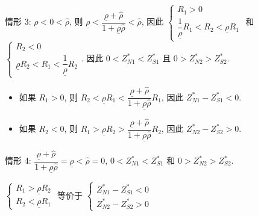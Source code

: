 \documentclass[10.0pt]{article}
\begin{document}
情形 3: $ \underline{\rho} < 0 < {\hat \rho} $, 则 $ \underline{\rho} < \dfrac{\underline{\rho} + {\hat \rho}}{1 + \underline{\rho} {\hat \rho}} < {\hat \rho} $, 因此 $ \left\{ \begin{matrix} R_1 > 0 \\ \dfrac{1}{\underline{\rho}} R_1 < R_2 < \underline{\rho} R_1 \end{matrix} \right. $ 和 $ \left\{ \begin{matrix} R_2 < 0 \\ \underline{\rho} R_2 < R_1 < \dfrac{1}{\underline{\rho}} R_2 \end{matrix} \right. $.
因此 $ 0 < Z_{N 1}^* < Z_{S 1}^* $ 且 $ 0 > Z_{N 2}^* > Z_{S 2}^* $.
\begin{itemize}
\item 如果 $ R_1 > 0 $, 则 $ R_2 < \underline{\rho} R_1 < \dfrac{\underline{\rho} + {\hat \rho}}{1 + \underline{\rho} {\hat \rho}} R_1 $, 因此 $ Z_{N 1}^* - Z_{S 1}^* < 0 $.
\item 如果 $ R_2 < 0 $, 则 $ R_1 > \underline{\rho} R_2 > \dfrac{\underline{\rho} + {\hat \rho}}{1 + \underline{\rho} {\hat \rho}} R_2 $, 因此 $ Z_{N 2}^* - Z_{S 2}^* > 0 $.

\end{itemize}

情形 4: $ \dfrac{\underline{\rho} + {\hat \rho}}{1 + \underline{\rho} {\hat \rho}} = \underline{\rho} < {\hat \rho} = 0 $, $ 0 < Z_{N 1}^* < Z_{S 1}^* $ 和 $ 0 > Z_{N 2}^* > Z_{S 2}^* $.

$ \left\{ \begin{matrix} R_1 > \underline{\rho} R_2 \\ R_2 < \underline{\rho} R_1 \end{matrix} \right. $ 等价于 $ \left\{ \begin{matrix} Z_{N 1}^* - Z_{S 1}^* < 0 \\ Z_{N 2}^* - Z_{S 2}^* > 0 \end{matrix} \right. $
\end{document}
